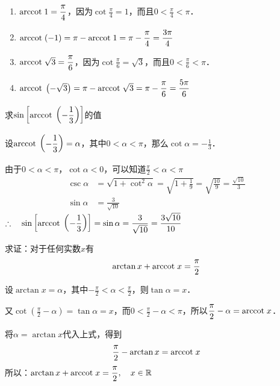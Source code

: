 \begin{solution}
\begin{enumerate}
    \item ${\rm arccot\; } 1=\dfrac{\pi}{4}$，因为$\cot\frac{\pi}{4}=1$，而且$0<\frac{\pi}{4}<\pi$．
    \item ${\rm arccot\; } (- 1)=\pi-{\rm arccot\; } 1=\pi-\dfrac{\pi}{4}=\dfrac{3\pi}{4}$
    \item ${\rm arccot\; } \sqrt{3}=\dfrac{\pi}{6}$，因为$\cot\frac{\pi}{6}=\sqrt{3}$，而且$0<\frac{\pi}{6}<\pi$．
    \item ${\rm arccot\; } \left(-\sqrt{3}\right)=\pi-{\rm arccot\; }\sqrt{3}=\pi-\dfrac{\pi}{6}=\dfrac{5\pi}{6}$
\end{enumerate}
\end{solution}


\begin{example}
    求$\sin\left[{\rm arccot\; }\left(-\dfrac{1}{3}\right)\right]$的值
\end{example}

\begin{solution}
    设${\rm arccot\; }\left(-\dfrac{1}{3}\right)=\alpha$，其中$0<\alpha<\pi$，那么$\cot\alpha=-\frac{1}{3}$．

    由于$0<\alpha<\pi$，$\cot\alpha<0$，可以知道$\frac{\pi}{2}<\alpha<\pi$
\[\begin{split}
    \csc\alpha&=\sqrt{1+\cot^2\alpha}=\sqrt{1+\frac{1}{9}}=\sqrt{\frac{10}{9}}=\frac{\sqrt{10}}{3}\\
    \sin\alpha&=\frac{3}{\sqrt{10}}
\end{split}\]
$\therefore\quad \sin\left[{\rm arccot\; }\left(-\dfrac{1}{3}\right)\right]=\sin\alpha=\dfrac{3}{\sqrt{10}}=\dfrac{3\sqrt{10}}{10}$
\end{solution}


\begin{example}
    求证：对于任何实数$x$有
\[\arctan x+{\rm arccot\; } x=\dfrac{\pi}{2}\]
\end{example}

\begin{solution}
    设$\arctan x=\alpha$，其中$-\frac{\pi}{2}<\alpha<\frac{\pi}{2}$，则$\tan\alpha=x$．

    又$\cot\left(\frac{\pi}{2}-\alpha\right)=\tan\alpha=x$，而$0<\frac{\pi}{2}-\alpha<\pi$，所以$\dfrac{\pi}{2}-\alpha={\rm arccot\; } x$．

    将$\alpha=\arctan x$代入上式，得到
    \[\dfrac{\pi}{2}-\arctan x={\rm arccot\; } x\]
    所以：$\arctan x+{\rm arccot\; } x=\dfrac{\pi}{2},\quad x\in\mathbb{R}$
\end{solution}

